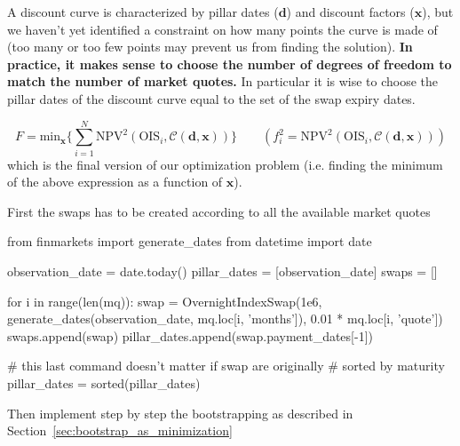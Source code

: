 A discount curve is characterized by pillar dates ($\mathbf{d}$) and discount factors ($\mathbf{x}$), but we haven't yet identified a constraint on how many points the curve is made of (too many or too few points may prevent us from finding the solution).
\textbf{In practice, it makes sense to choose the number of degrees of freedom to match the number of market quotes.} In particular it is wise to choose the pillar dates of the discount curve equal to the set of the swap expiry dates.

\begin{equation}
 F= \mathrm{min}_{\mathbf{x}} \Big\{\sum_{i=1}^{N}\mathrm{NPV}^2(\mathrm{OIS}_i, \mathcal{C}(\mathbf{d}, \mathbf{x}))\Big\}\qquad (f_i^2 = \mathrm{NPV}^2(\mathrm{OIS}_i, \mathcal{C}(\mathbf{d}, \mathbf{x})))
\end{equation}
which is the final version of our optimization problem (i.e. finding the minimum of the above expression as a function of $\mathbf{x}$).

First the swaps has to be created according to all the available market quotes

\begin{ipython}
from finmarkets import generate_dates
from datetime import date

observation_date = date.today()
pillar_dates = [observation_date]
swaps = []

for i in range(len(mq)):
    swap = OvernightIndexSwap(1e6,
             generate_dates(observation_date,
                            mq.loc[i, 'months']),
             0.01 * mq.loc[i, 'quote'])
    swaps.append(swap)
	pillar_dates.append(swap.payment_dates[-1])

# this last command doesn't matter if swap are originally
# sorted by maturity	
pillar_dates = sorted(pillar_dates)
\end{ipython}

Then implement step by step the bootstrapping as described in Section~\ref{sec:bootstrap_as_minimization}

